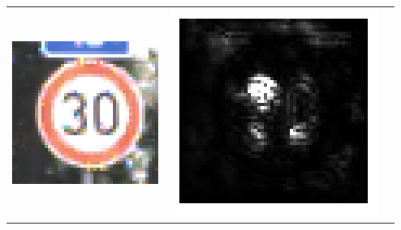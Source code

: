 	
	
\begin{tabular}{p{4.4cm}p{4.4cm}p{4.4cm}}
	 \includegraphics[width=\linewidth]{Images/AnPe/10771} & \includegraphics[width=\linewidth]{Images/AnPe/10771_guided} &

\end{tabular}
